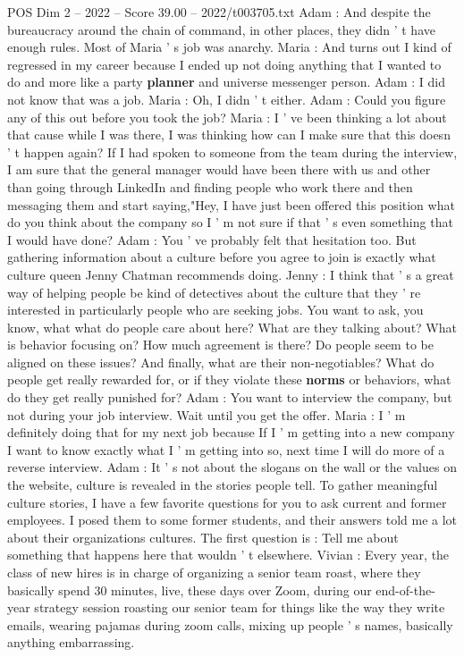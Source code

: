 \begin{textsample}{POS Dim 2 – 2022 – Score 39.00 – 2022/t003705.txt}
Adam : And despite the bureaucracy around the chain of command, in other places, they didn ' t have enough rules.
Most of Maria ' s job was anarchy.
Maria : And turns out I kind of regressed in my career because I ended up not doing anything that I wanted to do and more like a party \textbf{planner} and universe messenger person.
Adam : I did not know that was a job.
Maria : Oh, I didn ' t either.
Adam : Could you figure any of this out before you took the job?
Maria : I ' ve been thinking a lot about that cause while I was there, I was thinking how can I make sure that this doesn ' t happen again?
If I had spoken to someone from the team during the interview, I am sure that the general manager would have been there with us and other than going through LinkedIn and finding people who work there and then messaging them and start saying,"Hey, I have just been offered this position what do you think about the company so I ' m not sure if that ' s even something that I would have done?
Adam : You ' ve probably felt that hesitation too.
But gathering information about a culture before you agree to join is exactly what culture queen Jenny Chatman recommends doing.
Jenny : I think that ' s a great way of helping people be kind of detectives about the culture that they ' re interested in particularly people who are seeking jobs.
You want to ask, you know, what what do people care about here?
What are they talking about?
What is behavior focusing on?
How much agreement is there?
Do people seem to be aligned on these issues?
And finally, what are their non-negotiables?
What do people get really rewarded for, or if they violate these \textbf{norms} or behaviors, what do they get really punished for?
Adam : You want to interview the company, but not during your job interview.
Wait until you get the offer.
Maria : I ' m definitely doing that for my next job because If I ' m getting into a new company I want to know exactly what I ' m getting into so, next time I will do more of a reverse interview.
Adam : It ' s not about the slogans on the wall or the values on the website, culture is revealed in the stories people tell.
To gather meaningful culture stories, I have a few favorite questions for you to ask current and former employees.
I posed them to some former students, and their answers told me a lot about their organizations cultures.
The first question is : Tell me about something that happens here that wouldn ' t elsewhere.
Vivian : Every year, the class of new hires is in charge of organizing a senior team roast, where they basically spend 30 minutes, live, these days over Zoom, during our end-of-the-year strategy session roasting our senior team for things like the way they write emails, wearing pajamas during zoom calls, mixing up people ' s names, basically anything embarrassing.

\end{textsample}
